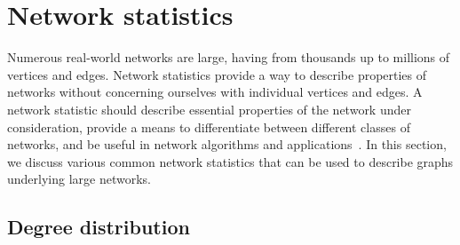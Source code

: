


\section{Network statistics}

Numerous real-world networks are large, having from thousands up to
millions of vertices and edges. Network statistics provide a way to
describe properties of networks without concerning ourselves with
individual vertices and edges. A network statistic should describe
essential properties of the network under consideration, provide a
means to differentiate between different classes of networks, and be
useful in network algorithms and
applications~\cite{BrinkmeierSchank2005}. In this section, we discuss
various common network statistics that can be used to describe graphs
underlying large networks.



\subsection{Degree distribution}
\label{subsec:random_graphs:degree_distribution}

